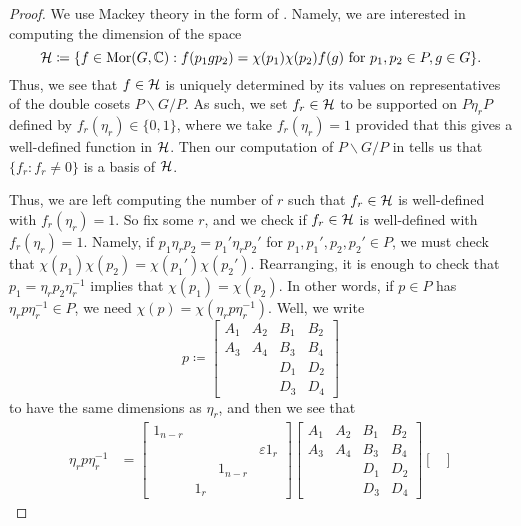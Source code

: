 \begin{proof}
    We use Mackey theory in the form of \cite[Theorem~32.1]{bump-lie-group}. Namely, we are interested in computing the dimension of the space
    \[\mathcal{H}\coloneqq\{f\in\operatorname{Mor}(G,\mathbb C):f(p_1gp_2)=\chi(p_1)\chi(p_2)f(g)\text{ for }p_1,p_2\in P,g\in G\}.\]
    Thus, we see that $f\in \mathcal{H}$ is uniquely determined by its values on representatives of the double cosets $P\backslash G/P$. As such, we set $f_r\in \mathcal{H}$ to be supported on $P\eta_rP$ defined by $f_r(\eta_r)\in\{0,1\}$, where we take $f_r(\eta_r)=1$ provided that this gives a well-defined function in $\mathcal{H}$. Then our computation of $P\backslash G/P$ in  tells us that $\{f_r:f_r\ne0\}$ is a basis of $\mathcal{H}$.

    Thus, we are left computing the number of $r$ such that $f_r\in \mathcal{H}$ is well-defined with $f_r(\eta_r)=1$. So fix some $r$, and we check if $f_r\in \mathcal{H}$ is well-defined with $f_r(\eta_r)=1$. Namely, if $p_1\eta_rp_2=p_1'\eta_rp_2'$ for $p_1,p_1',p_2,p_2'\in P$, we must check that $\chi(p_1)\chi(p_2)=\chi(p_1')\chi(p_2')$. Rearranging, it is enough to check that $p_1=\eta_rp_2\eta_r^{-1}$ implies that $\chi(p_1)=\chi(p_2)$. In other words, if $p\in P$ has $\eta_rp\eta_r^{-1}\in P$, we need $\chi(p)=\chi\left(\eta_rp\eta_r^{-1}\right)$. Well, we write
    \[p\coloneqq\begin{bmatrix}
        A_1 & A_2 & B_1 & B_2 \\
        A_3 & A_4 & B_3 & B_4 \\
            &     & D_1 & D_2 \\
            &     & D_3 & D_4
    \end{bmatrix}\]
    to have the same dimensions as $\eta_r$, and then we see that
    \begin{align*}
        \eta_rp\eta_r^{-1} &= \begin{bmatrix}
            1_{n-r} \\
            &&& \varepsilon 1_{r} \\
            && 1_{n-r} \\
            & 1_{r}
        \end{bmatrix}\begin{bmatrix}
            A_1 & A_2 & B_1 & B_2 \\
            A_3 & A_4 & B_3 & B_4 \\
                &     & D_1 & D_2 \\
                &     & D_3 & D_4
        \end{bmatrix}\begin{bmatrix}

\end{bmatrix}
\end{align*}
\end{proof}

